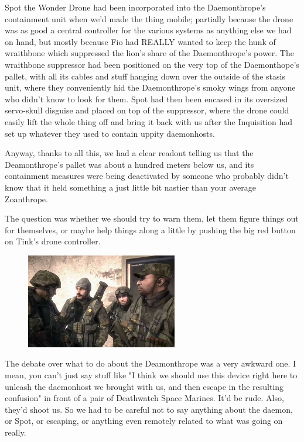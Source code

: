 Spot the Wonder Drone had been incorporated into the Daemonthrope's containment unit when we'd made the thing mobile; 
partially because the drone was as good a central controller for the various systems as anything else we had on hand, but mostly because Fio had REALLY wanted to keep the hunk of wraithbone which suppressed the lion's share of the Daemonthrope's power. 
The wraithbone suppressor had been positioned on the very top of the Daemonthope's pallet, with all its cables and stuff hanging down over the outside of the stasis unit, where they conveniently hid the Daemonthrope's smoky wings from anyone who didn't know to look for them. 
Spot had then been encased in its oversized servo-skull disguise and placed on top of the suppressor, where the drone could easily lift the whole thing off and bring it back with us after the Inquisition had set up whatever they used to contain uppity daemonhosts. 


Anyway, thanks to all this, we had a clear readout telling us that the Deamonthrope's pallet was about a hundred meters below us, and its containment measures were being deactivated by someone who probably didn't know that it held something a just little bit nastier than your average Zoanthrope.

The question was whether we should try to warn them, let them figure things out for themselves, or maybe help things along a little by pushing the big red button on Tink's drone controller.
\begin{figure}
	\begin{center}
		\includegraphics[width=\figwidth]{pics/16/8.png}
	\end{center}
\end{figure}
The debate over what to do about the Deamonthrope was a very awkward one. 
I mean, you can't just say stuff like "I think we should use this device right here to unleash the daemonhost we brought with us, and then escape in the resulting confusion" in front of a pair of Deathwatch Space Marines. 
It'd be rude. 
Also, they'd shoot us. 
So we had to be careful not to say anything about the daemon, or Spot, or escaping, or anything even remotely related to what was going on really.

